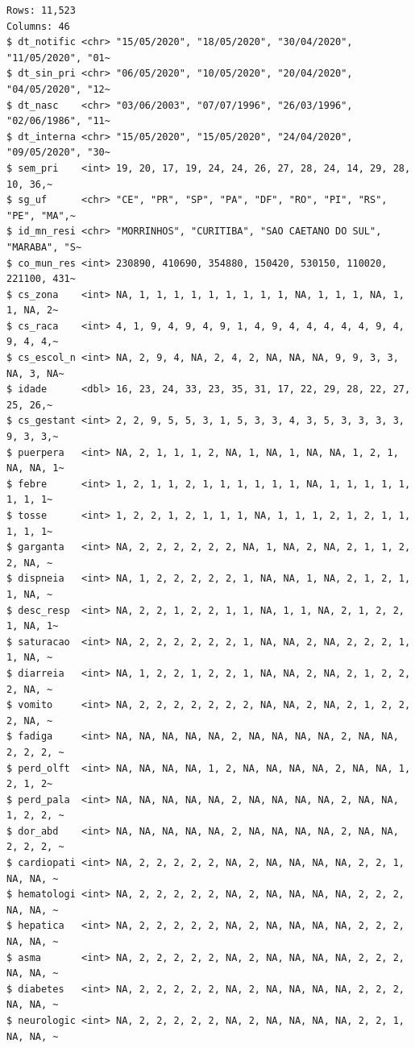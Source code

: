 \documentclass[
  letterpaper,
  DIV=11,
  numbers=noendperiod]{scrreprt}
\begin{document}
\begin{verbatim}
Rows: 11,523
Columns: 46
$ dt_notific <chr> "15/05/2020", "18/05/2020", "30/04/2020", "11/05/2020", "01~
$ dt_sin_pri <chr> "06/05/2020", "10/05/2020", "20/04/2020", "04/05/2020", "12~
$ dt_nasc    <chr> "03/06/2003", "07/07/1996", "26/03/1996", "02/06/1986", "11~
$ dt_interna <chr> "15/05/2020", "15/05/2020", "24/04/2020", "09/05/2020", "30~
$ sem_pri    <int> 19, 20, 17, 19, 24, 24, 26, 27, 28, 24, 14, 29, 28, 10, 36,~
$ sg_uf      <chr> "CE", "PR", "SP", "PA", "DF", "RO", "PI", "RS", "PE", "MA",~
$ id_mn_resi <chr> "MORRINHOS", "CURITIBA", "SAO CAETANO DO SUL", "MARABA", "S~
$ co_mun_res <int> 230890, 410690, 354880, 150420, 530150, 110020, 221100, 431~
$ cs_zona    <int> NA, 1, 1, 1, 1, 1, 1, 1, 1, 1, NA, 1, 1, 1, NA, 1, 1, NA, 2~
$ cs_raca    <int> 4, 1, 9, 4, 9, 4, 9, 1, 4, 9, 4, 4, 4, 4, 4, 9, 4, 9, 4, 4,~
$ cs_escol_n <int> NA, 2, 9, 4, NA, 2, 4, 2, NA, NA, NA, 9, 9, 3, 3, NA, 3, NA~
$ idade      <dbl> 16, 23, 24, 33, 23, 35, 31, 17, 22, 29, 28, 22, 27, 25, 26,~
$ cs_gestant <int> 2, 2, 9, 5, 5, 3, 1, 5, 3, 3, 4, 3, 5, 3, 3, 3, 3, 9, 3, 3,~
$ puerpera   <int> NA, 2, 1, 1, 1, 2, NA, 1, NA, 1, NA, NA, 1, 2, 1, NA, NA, 1~
$ febre      <int> 1, 2, 1, 1, 2, 1, 1, 1, 1, 1, 1, NA, 1, 1, 1, 1, 1, 1, 1, 1~
$ tosse      <int> 1, 2, 2, 1, 2, 1, 1, 1, NA, 1, 1, 1, 2, 1, 2, 1, 1, 1, 1, 1~
$ garganta   <int> NA, 2, 2, 2, 2, 2, 2, NA, 1, NA, 2, NA, 2, 1, 1, 2, 2, NA, ~
$ dispneia   <int> NA, 1, 2, 2, 2, 2, 2, 1, NA, NA, 1, NA, 2, 1, 2, 1, 1, NA, ~
$ desc_resp  <int> NA, 2, 2, 1, 2, 2, 1, 1, NA, 1, 1, NA, 2, 1, 2, 2, 1, NA, 1~
$ saturacao  <int> NA, 2, 2, 2, 2, 2, 2, 1, NA, NA, 2, NA, 2, 2, 2, 1, 1, NA, ~
$ diarreia   <int> NA, 1, 2, 2, 1, 2, 2, 1, NA, NA, 2, NA, 2, 1, 2, 2, 2, NA, ~
$ vomito     <int> NA, 2, 2, 2, 2, 2, 2, 2, NA, NA, 2, NA, 2, 1, 2, 2, 2, NA, ~
$ fadiga     <int> NA, NA, NA, NA, NA, 2, NA, NA, NA, NA, 2, NA, NA, 2, 2, 2, ~
$ perd_olft  <int> NA, NA, NA, NA, 1, 2, NA, NA, NA, NA, 2, NA, NA, 1, 2, 1, 2~
$ perd_pala  <int> NA, NA, NA, NA, NA, 2, NA, NA, NA, NA, 2, NA, NA, 1, 2, 2, ~
$ dor_abd    <int> NA, NA, NA, NA, NA, 2, NA, NA, NA, NA, 2, NA, NA, 2, 2, 2, ~
$ cardiopati <int> NA, 2, 2, 2, 2, 2, NA, 2, NA, NA, NA, NA, 2, 2, 1, NA, NA, ~
$ hematologi <int> NA, 2, 2, 2, 2, 2, NA, 2, NA, NA, NA, NA, 2, 2, 2, NA, NA, ~
$ hepatica   <int> NA, 2, 2, 2, 2, 2, NA, 2, NA, NA, NA, NA, 2, 2, 2, NA, NA, ~
$ asma       <int> NA, 2, 2, 2, 2, 2, NA, 2, NA, NA, NA, NA, 2, 2, 2, NA, NA, ~
$ diabetes   <int> NA, 2, 2, 2, 2, 2, NA, 2, NA, NA, NA, NA, 2, 2, 2, NA, NA, ~
$ neurologic <int> NA, 2, 2, 2, 2, 2, NA, 2, NA, NA, NA, NA, 2, 2, 1, NA, NA, ~

\end{verbatim}
\end{document}
